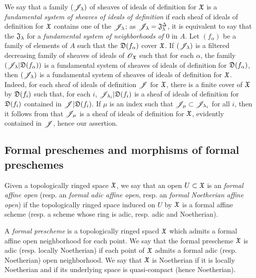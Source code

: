 \begin{env}[10.3.7]
\label{1.10.3.7}
We say that a family $(\mathscr{J}_\lambda)$ of sheaves of ideals of definition for $\mathfrak{X}$ is a \emph{fundamental system of sheaves of ideals of definition} if each sheaf of ideals of definition for $\mathfrak{X}$ contains one of the $\mathscr{J}_\lambda$; as $\mathscr{J}_\lambda=\mathfrak{J}_\lambda^\Delta$, it is equivalent to say that the $\mathfrak{J}_\lambda$ for a \emph{fundamental system of neighborhoods of $0$} in $A$.
Let $(f_\alpha)$ be a family of elements of $A$ such that the $\mathfrak{D}(f_\alpha)$ cover $\mathfrak{X}$.
If $(\mathscr{J}_\lambda)$ is a filtered decreasing family of sheaves of ideals of $\mathscr{O}_\mathfrak{X}$ such that for each $\alpha$, the family $(\mathscr{J}_\lambda|\mathfrak{D}(f_\alpha))$ is a fundamental system of sheaves of ideals of definition for $\mathfrak{D}(f_\alpha)$, then $(\mathscr{J}_\lambda)$ is a fundamental system of sheaves of ideals of definition for $\mathfrak{X}$.
Indeed, for each sheaf of ideals of definition $\mathscr{J}$ for $\mathfrak{X}$, there is a finite cover of $\mathfrak{X}$ by $\mathfrak{D}(f_i)$ such that, for each $i$, $\mathscr{J}_{\lambda_i}|\mathfrak{D}(f_i)$ is a sheaf of ideals of definition for $\mathfrak{D}(f_i)$ contained in $\mathscr{J}|\mathfrak{D}(f_i)$.
If $\mu$ is an index such that $\mathscr{J}_\mu\subset\mathscr{J}_{\lambda_i}$ for all $i$, then it follows from  that $\mathscr{J}_\mu$ is a sheaf of ideals of definition for $\mathfrak{X}$, evidently contained in $\mathscr{J}$, hence our assertion.
\end{env}

\subsection{Formal preschemes and morphisms of formal preschemes}
\label{subsection-formal-preschemes-and-morphisms}

\begin{env}[10.4.1]
\label{1.10.4.1}
Given a topologically ringed space $\mathfrak{X}$, we say that an open $U\subset\mathfrak{X}$ is an \emph{formal affine open} (resp. an \emph{formal adic affine open}, resp. an \emph{formal Noetherian affine open}) if the topologically ringed space induced on $U$ by $\mathfrak{X}$ is a formal affine scheme (resp. a scheme whose ring is adic, resp. adic and Noetherian).
\end{env}

\begin{defn}[10.4.2]
\label{1.10.4.2}
A \emph{formal prescheme} is a topologically ringed spacd $\mathfrak{X}$ which admits a formal affine open neighborhood for each point.
We say that the formal prescheme $\mathfrak{X}$ is adic (resp. locally Noetherian) if each point of $\mathfrak{X}$ admits a formal adic (resp. Noetherian) open neighborhood.
We say that $\mathfrak{X}$ is Noetherian if it is locally Noetherian and if its underlying space is quasi-compact (hence Noetherian).
\end{defn}

